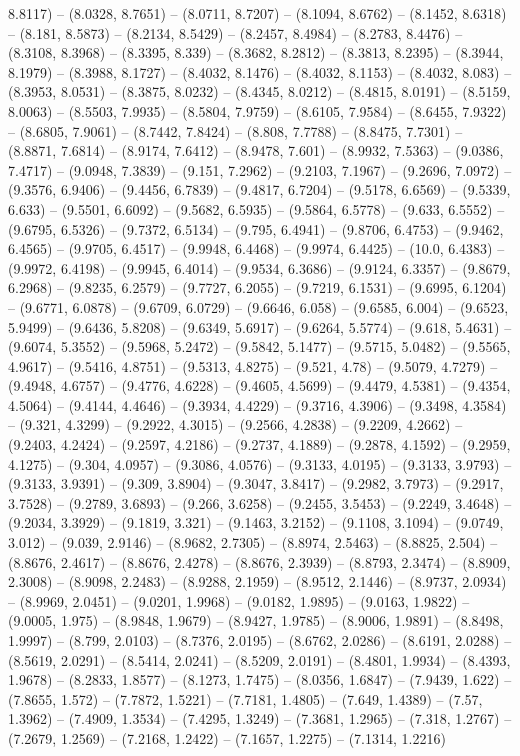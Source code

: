 8.8117) -- (8.0328, 8.7651) -- (8.0711, 8.7207) -- (8.1094, 8.6762) -- (8.1452, 8.6318) -- (8.181, 8.5873) -- (8.2134, 8.5429) -- (8.2457, 8.4984) -- (8.2783, 8.4476) -- (8.3108, 8.3968) -- (8.3395, 8.339) -- (8.3682, 8.2812) -- (8.3813, 8.2395) -- (8.3944, 8.1979) -- (8.3988, 8.1727) -- (8.4032, 8.1476) -- (8.4032, 8.1153) -- (8.4032, 8.083) -- (8.3953, 8.0531) -- (8.3875, 8.0232) -- (8.4345, 8.0212) -- (8.4815, 8.0191) -- (8.5159, 8.0063) -- (8.5503, 7.9935) -- (8.5804, 7.9759) -- (8.6105, 7.9584) -- (8.6455, 7.9322) -- (8.6805, 7.9061) -- (8.7442, 7.8424) -- (8.808, 7.7788) -- (8.8475, 7.7301) -- (8.8871, 7.6814) -- (8.9174, 7.6412) -- (8.9478, 7.601) -- (8.9932, 7.5363) -- (9.0386, 7.4717) -- (9.0948, 7.3839) -- (9.151, 7.2962) -- (9.2103, 7.1967) -- (9.2696, 7.0972) -- (9.3576, 6.9406) -- (9.4456, 6.7839) -- (9.4817, 6.7204) -- (9.5178, 6.6569) -- (9.5339, 6.633) -- (9.5501, 6.6092) -- (9.5682, 6.5935) -- (9.5864, 6.5778) -- (9.633, 6.5552) -- (9.6795, 6.5326) -- (9.7372, 6.5134) -- (9.795, 6.4941) -- (9.8706, 6.4753) -- (9.9462, 6.4565) -- (9.9705, 6.4517) -- (9.9948, 6.4468) -- (9.9974, 6.4425) -- (10.0, 6.4383) -- (9.9972, 6.4198) -- (9.9945, 6.4014) -- (9.9534, 6.3686) -- (9.9124, 6.3357) -- (9.8679, 6.2968) -- (9.8235, 6.2579) -- (9.7727, 6.2055) -- (9.7219, 6.1531) -- (9.6995, 6.1204) -- (9.6771, 6.0878) -- (9.6709, 6.0729) -- (9.6646, 6.058) -- (9.6585, 6.004) -- (9.6523, 5.9499) -- (9.6436, 5.8208) -- (9.6349, 5.6917) -- (9.6264, 5.5774) -- (9.618, 5.4631) -- (9.6074, 5.3552) -- (9.5968, 5.2472) -- (9.5842, 5.1477) -- (9.5715, 5.0482) -- (9.5565, 4.9617) -- (9.5416, 4.8751) -- (9.5313, 4.8275) -- (9.521, 4.78) -- (9.5079, 4.7279) -- (9.4948, 4.6757) -- (9.4776, 4.6228) -- (9.4605, 4.5699) -- (9.4479, 4.5381) -- (9.4354, 4.5064) -- (9.4144, 4.4646) -- (9.3934, 4.4229) -- (9.3716, 4.3906) -- (9.3498, 4.3584) -- (9.321, 4.3299) -- (9.2922, 4.3015) -- (9.2566, 4.2838) -- (9.2209, 4.2662) -- (9.2403, 4.2424) -- (9.2597, 4.2186) -- (9.2737, 4.1889) -- (9.2878, 4.1592) -- (9.2959, 4.1275) -- (9.304, 4.0957) -- (9.3086, 4.0576) -- (9.3133, 4.0195) -- (9.3133, 3.9793) -- (9.3133, 3.9391) -- (9.309, 3.8904) -- (9.3047, 3.8417) -- (9.2982, 3.7973) -- (9.2917, 3.7528) -- (9.2789, 3.6893) -- (9.266, 3.6258) -- (9.2455, 3.5453) -- (9.2249, 3.4648) -- (9.2034, 3.3929) -- (9.1819, 3.321) -- (9.1463, 3.2152) -- (9.1108, 3.1094) -- (9.0749, 3.012) -- (9.039, 2.9146) -- (8.9682, 2.7305) -- (8.8974, 2.5463) -- (8.8825, 2.504) -- (8.8676, 2.4617) -- (8.8676, 2.4278) -- (8.8676, 2.3939) -- (8.8793, 2.3474) -- (8.8909, 2.3008) -- (8.9098, 2.2483) -- (8.9288, 2.1959) -- (8.9512, 2.1446) -- (8.9737, 2.0934) -- (8.9969, 2.0451) -- (9.0201, 1.9968) -- (9.0182, 1.9895) -- (9.0163, 1.9822) -- (9.0005, 1.975) -- (8.9848, 1.9679) -- (8.9427, 1.9785) -- (8.9006, 1.9891) -- (8.8498, 1.9997) -- (8.799, 2.0103) -- (8.7376, 2.0195) -- (8.6762, 2.0286) -- (8.6191, 2.0288) -- (8.5619, 2.0291) -- (8.5414, 2.0241) -- (8.5209, 2.0191) -- (8.4801, 1.9934) -- (8.4393, 1.9678) -- (8.2833, 1.8577) -- (8.1273, 1.7475) -- (8.0356, 1.6847) -- (7.9439, 1.622) -- (7.8655, 1.572) -- (7.7872, 1.5221) -- (7.7181, 1.4805) -- (7.649, 1.4389) -- (7.57, 1.3962) -- (7.4909, 1.3534) -- (7.4295, 1.3249) -- (7.3681, 1.2965) -- (7.318, 1.2767) -- (7.2679, 1.2569) -- (7.2168, 1.2422) -- (7.1657, 1.2275) -- (7.1314, 1.2216) 